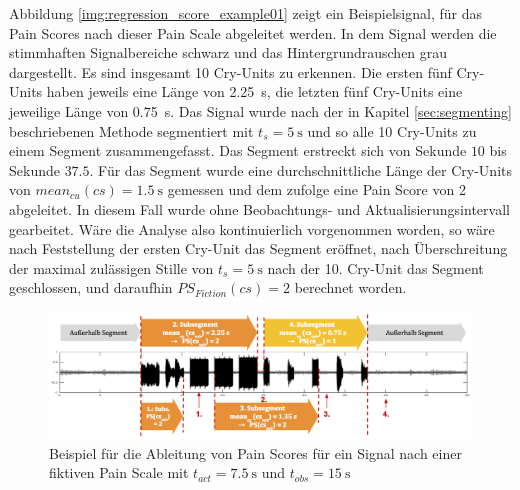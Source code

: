 Abbildung \ref{img:regression_score_example01} zeigt ein Beispielsignal, für das Pain Scores nach dieser Pain Scale abgeleitet werden. In dem Signal werden die stimmhaften Signalbereiche schwarz und das Hintergrundrauschen grau dargestellt. Es sind insgesamt 10 Cry-Units zu erkennen. Die ersten fünf Cry-Units haben jeweils eine Länge von \SI{2.25}{\second}, die letzten fünf Cry-Units eine jeweilige Länge von \SI{0.75}{\second}. Das Signal wurde nach der in Kapitel \ref{sec:segmenting} beschriebenen Methode segmentiert mit $t_s = \SI{5}{\second}$ und so alle 10 Cry-Units zu einem Segment zusammengefasst. Das Segment erstreckt sich von Sekunde $10$ bis Sekunde $37.5$. Für das Segment wurde eine durchschnittliche Länge der Cry-Units von $mean_{cu}(cs) = \SI{1.5}{\second}$ gemessen und dem zufolge eine Pain Score von 2 abgeleitet. In diesem Fall wurde ohne Beobachtungs- und Aktualisierungsintervall gearbeitet. Wäre die Analyse also kontinuierlich vorgenommen worden, so wäre nach Feststellung der ersten Cry-Unit das Segment eröffnet, nach Überschreitung der maximal zulässigen Stille von $t_s = \SI{5}{\second}$ nach der 10. Cry-Unit das Segment geschlossen, und daraufhin $PS_{Fiction}(cs) = 2$ berechnet worden.

\begin{figure}[h]
	\centering
	\includegraphics[width=1\textwidth]{bilder/regression_score_example05.png}
	\caption{Beispiel für die Ableitung von Pain Scores für ein Signal nach einer fiktiven Pain Scale mit $t_{act} = \SI{7.5}{\second}$ und $t_{obs} = \SI{15}{\second}$}
	\label{img:regression_score_example02}
\end{figure}

